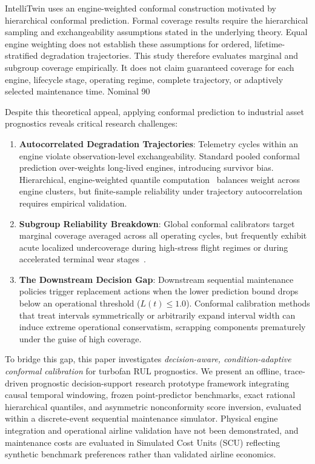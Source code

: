 IntelliTwin uses an engine-weighted conformal construction motivated by hierarchical conformal prediction. Formal coverage results require the hierarchical sampling and exchangeability assumptions stated in the underlying theory. Equal engine weighting does not establish these assumptions for ordered, lifetime-stratified degradation trajectories. This study therefore evaluates marginal and subgroup coverage empirically. It does not claim guaranteed coverage for each engine, lifecycle stage, operating regime, complete trajectory, or adaptively selected maintenance time. Nominal 90%

Despite this theoretical appeal, applying conformal prediction to industrial asset prognostics reveals critical research challenges:
\begin{enumerate}
  \item \textbf{Autocorrelated Degradation Trajectories}: Telemetry cycles within an engine violate observation-level exchangeability. Standard pooled conformal prediction over-weights long-lived engines, introducing survivor bias. Hierarchical, engine-weighted quantile computation~\cite{lee2023hierarchical} balances weight across engine clusters, but finite-sample reliability under trajectory autocorrelation requires empirical validation.
  \item \textbf{Subgroup Reliability Breakdown}: Global conformal calibrators target marginal coverage averaged across all operating cycles, but frequently exhibit acute localized undercoverage during high-stress flight regimes or during accelerated terminal wear stages~\cite{yang2026empirical,benabdennour2026grouped}.
  \item \textbf{The Downstream Decision Gap}: Downstream sequential maintenance policies trigger replacement actions when the lower prediction bound drops below an operational threshold ($L(t) \le 1.0$). Conformal calibration methods that treat intervals symmetrically or arbitrarily expand interval width can induce extreme operational conservatism, scrapping components prematurely under the guise of high coverage.
\end{enumerate}

To bridge this gap, this paper investigates \textit{decision-aware, condition-adaptive conformal calibration} for turbofan RUL prognostics. We present an offline, trace-driven prognostic decision-support research prototype framework integrating causal temporal windowing, frozen point-predictor benchmarks, exact rational hierarchical quantiles, and asymmetric nonconformity score inversion, evaluated within a discrete-event sequential maintenance simulator. Physical engine integration and operational airline validation have not been demonstrated, and maintenance costs are evaluated in Simulated Cost Units (SCU) reflecting synthetic benchmark preferences rather than validated airline economics.
